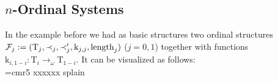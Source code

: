 \documentclass[10pt]{article}
\def\ar{\rightarrow}
\def\length{\mathrm{length}}
\def\k{\mathrm{k}}
\def\T{\mathrm{T}}
\def\calF{\mathcal{F}}
\begin{document}
\subsection{$n$-Ordinal Systems}
In the example before we had as  basic structures two
ordinal structures 
$\calF_j:=(\T_j,\prec_j,\break 
\prec_j',\k_{j,j},\length_j)$ ($j=0,1$) together
with functions $\k_{i,1-i}:\T_i \ar_\omega \T_{1-i}$.
It can be visualized as follows:\\
\noindent%
\font\thinlinefont=cmr5
%
\begingroup\makeatletter\ifx\SetFigFont\undefined
\def\x#1#2#3#4#5#6#7\relax{\def\x{#1#2#3#4#5#6}}%
\expandafter\x\fmtname xxxxxx\relax \def\y{splain}%
\ifx\x\y   %
\gdef\SetFigFont#1#2#3{%
  \ifnum #1<17\tiny\else \ifnum #1<20\small\else
  \ifnum #1<24\normalsize\else \ifnum #1<29\large\else
  \ifnum #1<34\Large\else \ifnum #1<41\LARGE\else
     \huge\fi\fi\fi\fi\fi\fi
  \csname #3\endcsname}%
\else
\gdef\SetFigFont#1#2#3{\begingroup
  \count@#1\relax \ifnum 25<\count@\count@25\fi
  \def\x{\endgroup\@setsize\SetFigFont{#2pt}}%
  \expandafter\x
    \csname \romannumeral\the\count@ pt\expandafter\endcsname
    \csname @\romannumeral\the\count@ pt\endcsname
  \csname #3\endcsname}%
\fi
\fi\endgroup
\end{document}
